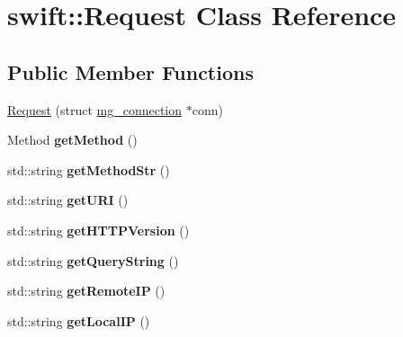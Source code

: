 \hypertarget{classswift_1_1_request}{\section{swift\-:\-:Request Class Reference}
\label{classswift_1_1_request}
}
\subsection*{Public Member Functions}
\begin{DoxyCompactItemize}
\item 
\hyperlink{classswift_1_1_request_aede86c57b7c39bc6577a4c4f2f2bf0b8}{Request} (struct \hyperlink{structmg__connection}{mg\-\_\-connection} $\ast$conn)
\item 
\hypertarget{classswift_1_1_request_a328f2b94e10e080c5fd1b6387b71137d}{Method {\bfseries get\-Method} ()}\label{classswift_1_1_request_a328f2b94e10e080c5fd1b6387b71137d}

\item 
\hypertarget{classswift_1_1_request_a65044036527328dd16d663e188ea0a9b}{std\-::string {\bfseries get\-Method\-Str} ()}\label{classswift_1_1_request_a65044036527328dd16d663e188ea0a9b}

\item 
\hypertarget{classswift_1_1_request_adc50d14c9210515e0787efc6085f59c3}{std\-::string {\bfseries get\-U\-R\-I} ()}\label{classswift_1_1_request_adc50d14c9210515e0787efc6085f59c3}

\item 
\hypertarget{classswift_1_1_request_ade67461a7ea078229ec148f16b419395}{std\-::string {\bfseries get\-H\-T\-T\-P\-Version} ()}\label{classswift_1_1_request_ade67461a7ea078229ec148f16b419395}

\item 
\hypertarget{classswift_1_1_request_a271ca3d7daa2541890db65560416443e}{std\-::string {\bfseries get\-Query\-String} ()}\label{classswift_1_1_request_a271ca3d7daa2541890db65560416443e}

\item 
\hypertarget{classswift_1_1_request_a4db2baff092ff72728e6514d990375ca}{std\-::string {\bfseries get\-Remote\-I\-P} ()}\label{classswift_1_1_request_a4db2baff092ff72728e6514d990375ca}

\item 
\hypertarget{classswift_1_1_request_a1feb5c291556a2e5b5a8699a28115ac6}{std\-::string {\bfseries get\-Local\-I\-P} ()}\label{classswift_1_1_request_a1feb5c291556a2e5b5a8699a28115ac6}


\end{DoxyCompactItemize}
